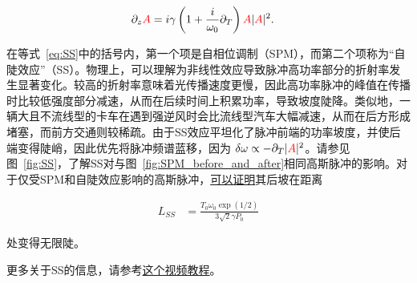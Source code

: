 \begin{align}
\label{eq:SS}
    \partial_z\textcolor{red}{A} &= i\gamma\left(1+\frac{i}{\omega_0}\partial_T \right)\textcolor{red}{A}|\textcolor{red}{A}|^2.
\end{align}

在等式~\ref{eq:SS}中的括号内，第一个项是自相位调制（SPM），而第二个项称为“自陡效应”（SS）。物理上，可以理解为非线性效应导致脉冲高功率部分的折射率发生显著变化。较高的折射率意味着光传播速度更慢，因此高功率脉冲的峰值在传播时比较低强度部分减速，从而在后续时间上积累功率，导致坡度陡降。类似地，一辆大且不流线型的卡车在遇到强逆风时会比流线型汽车大幅减速，从而在后方形成堵塞，而前方交通则较稀疏。由于SS效应平坦化了脉冲前端的功率坡度，并使后端变得陡峭，因此优先将脉冲频谱蓝移，因为 $\delta\omega\propto -\partial_T|\textcolor{red}{A}|^2$。请参见图~\ref{fig:SS}，了解SS对与图~\ref{fig:SPM_before_and_after}相同高斯脉冲的影响。对于仅受SPM和自陡效应影响的高斯脉冲，\href{https://prefetch.eu/know/concept/self-steepening/}{可以证明}其后坡在距离

\begin{align}
    L_{SS} &= \frac{T_0\omega_0\exp(1/2)}{3\sqrt{2}\gamma P_0}
\end{align}

处变得无限陡。

更多关于SS的信息，请参考\href{https://youtu.be/Fr6yLtGZ2To}{这个视频教程}。

